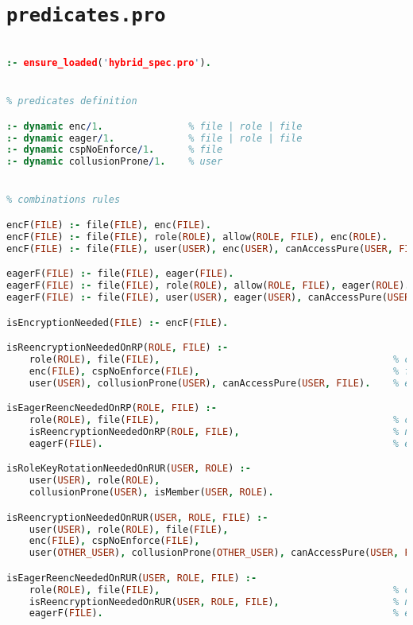 \section{\texttt{predicates.pro}}
\label{app:prologcode.predicates}

\setcode
\begin{lstlisting}[language=Prolog]
% imports

:- ensure_loaded('hybrid_spec.pro').


% predicates definition

:- dynamic enc/1.               % file | role | file
:- dynamic eager/1.             % file | role | file
:- dynamic cspNoEnforce/1.      % file
:- dynamic collusionProne/1.    % user


% combinations rules

encF(FILE) :- file(FILE), enc(FILE).
encF(FILE) :- file(FILE), role(ROLE), allow(ROLE, FILE), enc(ROLE). 
encF(FILE) :- file(FILE), user(USER), enc(USER), canAccessPure(USER, FILE).

eagerF(FILE) :- file(FILE), eager(FILE).
eagerF(FILE) :- file(FILE), role(ROLE), allow(ROLE, FILE), eager(ROLE). 
eagerF(FILE) :- file(FILE), user(USER), eager(USER), canAccessPure(USER, FILE).

isEncryptionNeeded(FILE) :- encF(FILE).

isReencryptionNeededOnRP(ROLE, FILE) :-
    role(ROLE), file(FILE),                                         % checks
    enc(FILE), cspNoEnforce(FILE),                                  % file encrypted & csp not trusted to protect this file
    user(USER), collusionProne(USER), canAccessPure(USER, FILE).    % exists a user that can access and is not trusted

isEagerReencNeededOnRP(ROLE, FILE) :-
    role(ROLE), file(FILE),                                         % checks
    isReencryptionNeededOnRP(ROLE, FILE),                           % need reencryption
    eagerF(FILE).                                                   % eager file (also indirectly)

isRoleKeyRotationNeededOnRUR(USER, ROLE) :-
    user(USER), role(ROLE),
    collusionProne(USER), isMember(USER, ROLE).

isReencryptionNeededOnRUR(USER, ROLE, FILE) :-
    user(USER), role(ROLE), file(FILE),                                         % checks
    enc(FILE), cspNoEnforce(FILE),                                              % file encrypted & csp not trusted to protect this file
    user(OTHER_USER), collusionProne(OTHER_USER), canAccessPure(USER, FILE).    % exists a user that can access and is not trusted

isEagerReencNeededOnRUR(USER, ROLE, FILE) :-
    role(ROLE), file(FILE),                                         % checks
    isReencryptionNeededOnRUR(USER, ROLE, FILE),                    % need reencryption
    eagerF(FILE).                                                   % eager file (also indirectly)    
\end{lstlisting}